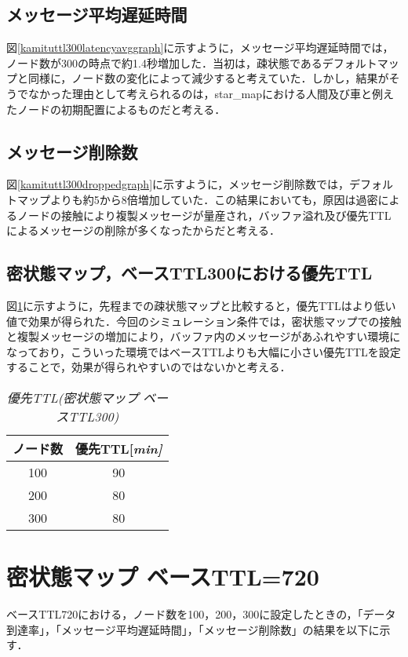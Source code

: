 \documentclass[11pt]{icsthesis}
\begin{document}
\subsection{メッセージ平均遅延時間}
図\ref{kamituttl300latencyavggraph}に示すように，メッセージ平均遅延時間では，ノード数が300の時点で約1.4秒増加した．当初は，疎状態であるデフォルトマップと同様に，ノード数の変化によって減少すると考えていた．しかし，結果がそうでなかった理由として考えられるのは，star\_mapにおける人間及び車と例えたノードの初期配置によるものだと考える．

\subsection{メッセージ削除数}
図\ref{kamituttl300droppedgraph}に示すように，メッセージ削除数では，デフォルトマップよりも約5から8倍増加していた．この結果においても，原因は過密によるノードの接触により複製メッセージが量産され，バッファ溢れ及び優先TTLによるメッセージの削除が多くなったからだと考える．

\subsection{密状態マップ，ベースTTL300における優先TTL}
図\ref{priorityTTL_kamitsu300}に示すように，先程までの疎状態マップと比較すると，優先TTLはより低い値で効果が得られた．今回のシミュレーション条件では，密状態マップでの接触と複製メッセージの増加により，バッファ内のメッセージがあふれやすい環境になっており，こういった環境ではベースTTLよりも大幅に小さい優先TTLを設定することで，効果が得られやすいのではないかと考える．
\begin{table}[H]
	\begin{center}
			 \caption[]{\it{優先TTL(密状態マップ ベースTTL300)}}
			 \label{priorityTTL_kamitsu300}
			 \begin{tabular}{|c|c|}
 \hline
 ノード数&優先TTL[\it{min}]\\
 \hline
 100&90\\
 \hline
 200&80\\
 \hline
 300&80\\
 \hline
			 \end{tabular}
		 \end{center}
 \end{table}
\newpage


\section{密状態マップ ベースTTL=720}
ベースTTL720における，ノード数を100，200，300に設定したときの，「データ到達率」，「メッセージ平均遅延時間」，「メッセージ削除数」の結果を以下に示す．
\end{document}

